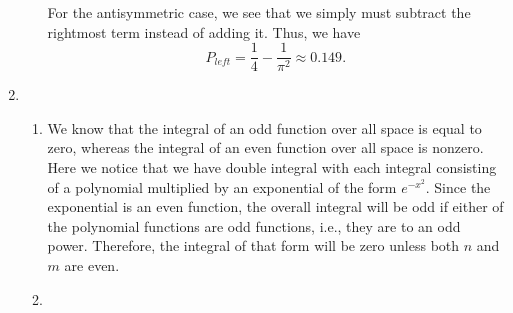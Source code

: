 \documentclass[10pt]{article}
\begin{document}
\begin{enumerate}
\begin{enumerate}
    For the antisymmetric case, we see that we simply must subtract the rightmost term instead of adding it.
    Thus, we have
   \[
     P_{left} = \frac{1}{4} - \frac{1}{\pi^2} \approx \num{0,149}
   .\]
  \end{enumerate}
\item 
  \begin{enumerate}
  \item 
    We know that the integral of an odd function over all space is equal to zero, whereas the integral of an even function over all space is nonzero.
    Here we notice that we have double integral with each integral consisting of a polynomial multiplied by an exponential of the form $ e ^ {-x^2} $.
    Since the exponential is an even function, the overall integral will be odd if either of the polynomial functions are odd functions, i.e., they are to an odd power.
    Therefore, the integral of that form will be zero unless both $ n $ and $ m $ are even.
  \item 
    

\end{enumerate}
\end{enumerate}
\end{document}
